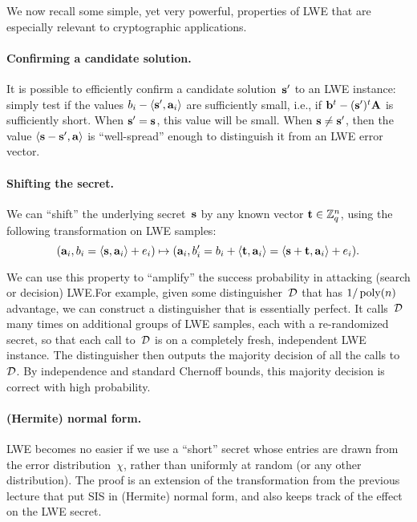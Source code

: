 \documentclass[11pt]{article}
\begin{document}
We now recall some simple, yet very powerful, properties of LWE that
are especially relevant to cryptographic applications.

\paragraph{Confirming a candidate solution.}

It is possible to efficiently confirm a candidate solution~$\mathbf{s}'$ to
an LWE instance: simply test if the values
$b_{i} - \langle\mathbf{s}',\mathbf{a}_i\rangle$ are sufficiently small, i.e., if
$\mathbf{b}^{t} - (\mathbf{s}')^{t} \mathbf{A}$ is sufficiently short. When
$\mathbf{s}' = \mathbf{s}$, this value will be small. When $\mathbf{s} \neq \mathbf{s}'$,
then the value $\langle\mathbf{s} - \mathbf{s}',\mathbf{a}\rangle$ is ``well-spread''
enough to distinguish it from an LWE error vector.

\paragraph{Shifting the secret.}

We can ``shift'' the underlying secret~$\mathbf{s}$ by any known vector
$\mathbf{t} \in \mathbb{Z}_q^n$, using the following transformation on LWE samples:
\[ (\mathbf{a}_i, b_i = \langle\mathbf{s},\mathbf{a}_i\rangle+e_i) \mapsto (\mathbf{a}_i, b'_i =
  b_i + \langle\mathbf{t},\mathbf{a}_i\rangle = \langle\mathbf{s}+\mathbf{t},\mathbf{a}_i\rangle + e_i)
  . \]

We can use this property to ``amplify'' the success probability in
attacking (search or decision) LWE.\@ For example, given some
distinguisher~$\mathcal{D}$ that has $1/\operatorname{poly}(n)$ advantage, we can
construct a distinguisher that is essentially perfect. It
calls~$\mathcal{D}$ many times on additional groups of LWE samples, each
with a re-randomized secret, so that each call to~$\mathcal{D}$ is on a
completely fresh, independent LWE instance. The distinguisher then
outputs the majority decision of all the calls to~$\mathcal{D}$. By
independence and standard Chernoff bounds, this majority decision is
correct with high probability.

\paragraph{(Hermite) normal form.}

LWE becomes no easier if we use a ``short'' secret whose entries are
drawn from the error distribution~$\chi$, rather than uniformly at
random (or any other distribution). The proof is an extension of the
transformation from the previous lecture that put SIS in (Hermite)
normal form, and also keeps track of the effect on the LWE secret.
\end{document}

